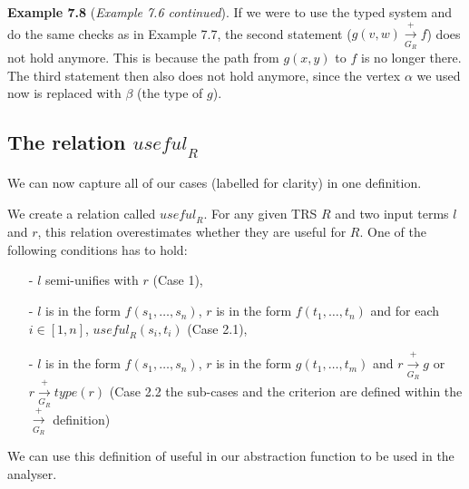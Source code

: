 \textbf{Example 7.8} (\textit{Example 7.6 continued}). If we were to use the typed system and do the same checks as in Example 7.7, the second statement ($g(v, w) \xrightarrow[G_R]{+} f$) does not hold anymore. This is because the path from $g(x, y)$ to $f$ is no longer there. The third statement then also does not hold anymore, since the vertex $\alpha$ we used now is replaced with $\beta$ (the type of $g$). 

\subsection{The relation $\textit{useful}_R$}
We can now capture all of our cases (labelled for clarity) in one definition. 
\begin{definition}
\label{def:useful}
We create a relation called $\textit{useful}_R$. For any given TRS $R$ and two input terms $l$ and $r$, this relation overestimates whether they are useful for $R$. One of the following conditions has to hold:
\begin{itemize}
    \itemsep -.1em
    \item[-] $l$ semi-unifies with $r$ (Case 1),
    \item[-] $l$ is in the form $f(s_1, \dots, s_n)$, $r$ is in the form $f(t_1, \dots, t_n)$ and for each $i \in [1, n]$, $\textit{useful}_R(s_i, t_i)$ (Case 2.1),
    \item[-] $l$ is in the form $f(s_1, \dots, s_n)$, $r$ is in the form $g(t_1, \dots, t_m)$ and $r \xrightarrow[G_R]{+} g$ or $r \xrightarrow[G_R]{+} \textit{type}(r)$ (Case 2.2 the sub-cases and the criterion are defined within the $\xrightarrow[G_R]{+}$ definition)
\end{itemize}
\end{definition}

We can use this definition of useful in our abstraction function to be used in the analyser. 

